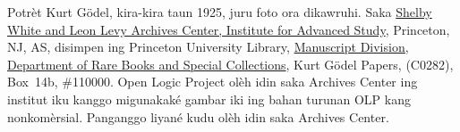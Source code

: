 Potrèt Kurt G\"odel, kira-kira taun 1925, juru foto ora dikawruhi.
Saka \href{https://library.ias.edu/archives}{Shelby White and Leon Levy
Archives Center, Institute for Advanced Study}, Princeton, NJ, AS,
disimpen ing Princeton University Library,
\href{http://rbsc.princeton.edu/divisions/manuscripts-division}{Manuscript
Division, Department of Rare Books and Special Collections}, Kurt
G\"odel Papers, (C0282), Box~14b, \#110000.
Open Logic Project olèh idin saka Archives Center ing institut iku
kanggo migunakaké gambar iki ing bahan turunan OLP kang nonkomèrsial.
Panganggo liyané kudu olèh idin saka Archives Center.
